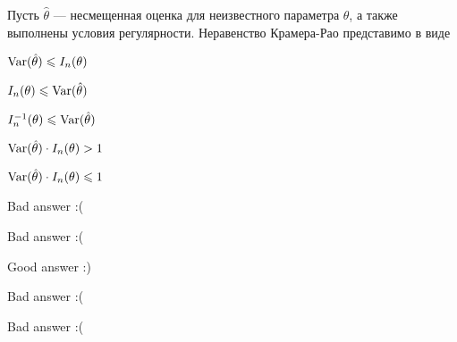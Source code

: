
\begin{question}
Пусть \(\hat{\theta}\) — несмещенная оценка для неизвестного параметра
\(\theta\), а также выполнены условия регулярности. Неравенство
Крамера-Рао представимо в виде
\begin{answerlist}
  \item \(\operatorname{Var}(\hat{\theta}) \leqslant I_n(\theta)\)
  \item \(I_n(\theta) \leqslant \operatorname{Var}(\hat{\theta})\)
  \item \(I_n^{-1}(\theta) \leqslant \operatorname{Var}(\hat{\theta})\)
  \item \(\operatorname{Var}(\hat{\theta}) \cdot I_n(\theta) > 1\)
  \item \(\operatorname{Var}(\hat{\theta}) \cdot I_n(\theta) \leqslant 1\)
\end{answerlist}
\end{question}

\begin{solution}
\begin{answerlist}
  \item Bad answer :(
  \item Bad answer :(
  \item Good answer :)
  \item Bad answer :(
  \item Bad answer :(
\end{answerlist}
\end{solution}

